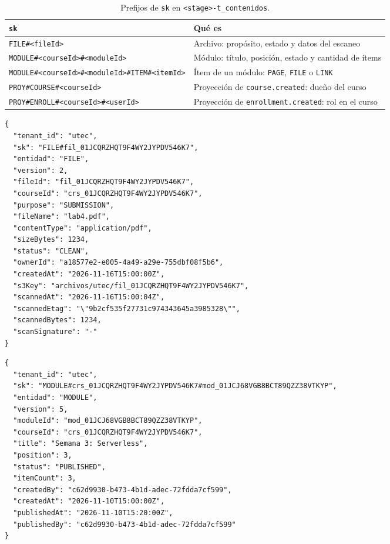 \begin{table}[htbp]
\centering\small
\begin{tabularx}{\textwidth}{lX}
\toprule
\texttt{sk} & Qué es \\
\midrule
\texttt{FILE\#<fileId>} & Archivo: propósito, estado y datos del escaneo \\
\texttt{MODULE\#<courseId>\#<moduleId>} & Módulo: título, posición, estado y cantidad de ítems \\
\texttt{MODULE\#<courseId>\#<moduleId>\#ITEM\#<itemId>} & Ítem de un módulo: \texttt{PAGE}, \texttt{FILE} o \texttt{LINK} \\
\texttt{PROY\#COURSE\#<courseId>} & Proyección de \texttt{course.created}: dueño del curso \\
\texttt{PROY\#ENROLL\#<courseId>\#<userId>} & Proyección de \texttt{enrollment.created}: rol en el curso \\
\bottomrule
\end{tabularx}
\caption{Prefijos de \texttt{sk} en \texttt{<stage>-t\_contenidos}.}
\end{table}

\begin{lstlisting}[caption={Archivo escaneado (\texttt{FILE\#})}]
{
  "tenant_id": "utec",
  "sk": "FILE#fil_01JCQRZHQT9F4WY2JYPDV546K7",
  "entidad": "FILE",
  "version": 2,
  "fileId": "fil_01JCQRZHQT9F4WY2JYPDV546K7",
  "courseId": "crs_01JCQRZHQT9F4WY2JYPDV546K7",
  "purpose": "SUBMISSION",
  "fileName": "lab4.pdf",
  "contentType": "application/pdf",
  "sizeBytes": 1234,
  "status": "CLEAN",
  "ownerId": "a18577e2-e005-4a49-a29e-755dbf08f5b6",
  "createdAt": "2026-11-16T15:00:00Z",
  "s3Key": "archivos/utec/fil_01JCQRZHQT9F4WY2JYPDV546K7",
  "scannedAt": "2026-11-16T15:00:04Z",
  "scannedEtag": "\"9b2cf535f27731c974343645a3985328\"",
  "scannedBytes": 1234,
  "scanSignature": "-"
}
\end{lstlisting}

\begin{lstlisting}[caption={Módulo publicado (\texttt{MODULE\#})}]
{
  "tenant_id": "utec",
  "sk": "MODULE#crs_01JCQRZHQT9F4WY2JYPDV546K7#mod_01JCJ68VGB8BCT89QZZ38VTKYP",
  "entidad": "MODULE",
  "version": 5,
  "moduleId": "mod_01JCJ68VGB8BCT89QZZ38VTKYP",
  "courseId": "crs_01JCQRZHQT9F4WY2JYPDV546K7",
  "title": "Semana 3: Serverless",
  "position": 3,
  "status": "PUBLISHED",
  "itemCount": 3,
  "createdBy": "c62d9930-b473-4b1d-adec-72fdda7cf599",
  "createdAt": "2026-11-10T15:00:00Z",
  "publishedAt": "2026-11-10T15:20:00Z",
  "publishedBy": "c62d9930-b473-4b1d-adec-72fdda7cf599"
}
\end{lstlisting}

